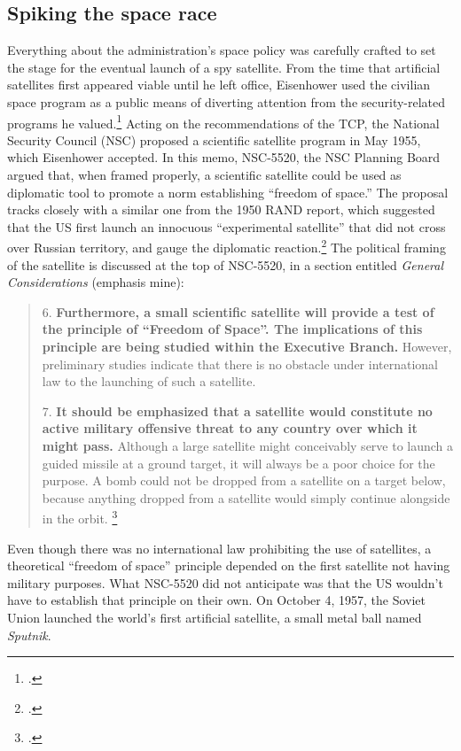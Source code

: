 \documentclass[11pt]{memoir}
\begin{document}
\subsection{Spiking the space race}
Everything about the administration's space policy was carefully crafted to set the stage for the eventual launch of a spy satellite. From the time that artificial satellites first appeared viable until he left office, Eisenhower used the civilian space program as a public means of diverting attention from the security-related programs he valued.\footcite[p.~119]{day_eye_2015} Acting on the recommendations of the TCP, the National Security Council (NSC) proposed a scientific satellite program in May 1955, which Eisenhower accepted. In this memo, NSC-5520, the NSC Planning Board argued that, when framed properly, a scientific satellite could be used as diplomatic tool to promote a norm establishing ``freedom of space.'' The proposal tracks closely with a similar one from the 1950 RAND report, which suggested that the US first launch an innocuous ``experimental satellite'' that did not cross over Russian territory, and gauge the diplomatic reaction.\footcite[p.~21]{kecskemetic_satellite_1950} The political framing of the satellite is discussed at the top of NSC-5520, in a section entitled \emph{General Considerations} (emphasis mine):

\begin{quote}
	6. \textelp{} \textbf{Furthermore, a small scientific satellite will provide a test of the principle of “Freedom of Space”. The implications of this principle are being studied within the Executive Branch.} However, preliminary studies indicate that there is no obstacle under international law to the launching of such a satellite.

	7. \textbf{It should be emphasized that a satellite would constitute no active military offensive threat to any country over which it might pass.} Although a large satellite might conceivably serve to launch a guided missile at a ground target, it will always be a poor choice for the purpose. A bomb could not be dropped from a satellite on a target below, because anything dropped from a satellite would simply continue alongside in the orbit. \footcite{nsc_planning_board_draft_1955}
\end{quote}
Even though there was no international law prohibiting the use of satellites, a theoretical ``freedom of space'' principle depended on the first satellite not having military purposes. What NSC-5520 did not anticipate was that the US wouldn't have to establish that principle on their own. On October 4, 1957, the Soviet Union launched the world's first artificial satellite, a small metal ball named \emph{Sputnik}.
\end{document}
